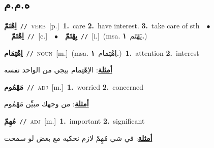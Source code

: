 \documentclass[10pt,a4paper,twoside]{article} %
\begin{document}
\begin{multicols}{2}
\vspace{-3mm}
\subsection*{\color{blue}\foreignlanguage{arabic}{ه.م.م}\color{blue}{}} 

{\setlength\topsep{0pt}\textbf{\foreignlanguage{arabic}{اِهْتَمّ}}\ {\color{gray}\texttt{//}\color{black}}\ \textsc{verb}\ [p.]\ \textbf{1.}~care  \textbf{2.}~have interest.  \textbf{3.}~take care of sth\ \ $\bullet$\ \ \setlength\topsep{0pt}\textbf{\foreignlanguage{arabic}{اِهْتَمّ}}\ {\color{gray}\texttt{//}\color{black}}\ [c.]\ \ $\bullet$\ \ \setlength\topsep{0pt}\textbf{\foreignlanguage{arabic}{يِهْتَمّ}}\ {\color{gray}\texttt{//}\color{black}}\ [i.]\ \color{gray}(msa. \foreignlanguage{arabic}{يَهْتَم}~\foreignlanguage{arabic}{\textbf{١.}})\color{black}\ } \vspace{2mm}

{\setlength\topsep{0pt}\textbf{\foreignlanguage{arabic}{اِهْتِمَام}}\ {\color{gray}\texttt{//}\color{black}}\ \textsc{noun}\ [m.]\ \color{gray}(msa. \foreignlanguage{arabic}{اِهْتِمام}~\foreignlanguage{arabic}{\textbf{١.}})\color{black}\ \textbf{1.}~attention  \textbf{2.}~interest\  \begin{flushright}\color{gray}\foreignlanguage{arabic}{\textbf{\underline{\foreignlanguage{arabic}{أمثلة}}}: الاِهْتِمام بيجي من الواحد نفسه}\end{flushright}\color{black}} \vspace{2mm}

{\setlength\topsep{0pt}\textbf{\foreignlanguage{arabic}{مَهْمُوم}}\ {\color{gray}\texttt{//}\color{black}}\ \textsc{adj}\ [m.]\ \textbf{1.}~worried  \textbf{2.}~concerned\  \begin{flushright}\color{gray}\foreignlanguage{arabic}{\textbf{\underline{\foreignlanguage{arabic}{أمثلة}}}: من وجهك مبيِّن مَهْمُوم}\end{flushright}\color{black}} \vspace{2mm}

{\setlength\topsep{0pt}\textbf{\foreignlanguage{arabic}{مُهِمّ}}\ {\color{gray}\texttt{//}\color{black}}\ \textsc{adj}\ [m.]\ \textbf{1.}~important  \textbf{2.}~significant\  \begin{flushright}\color{gray}\foreignlanguage{arabic}{\textbf{\underline{\foreignlanguage{arabic}{أمثلة}}}: في شي مُهِمّ لازم نحكيه مع بعض لو سمحت}\end{flushright}\color{black}} \vspace{2mm}


\end{multicols}
\end{document}
